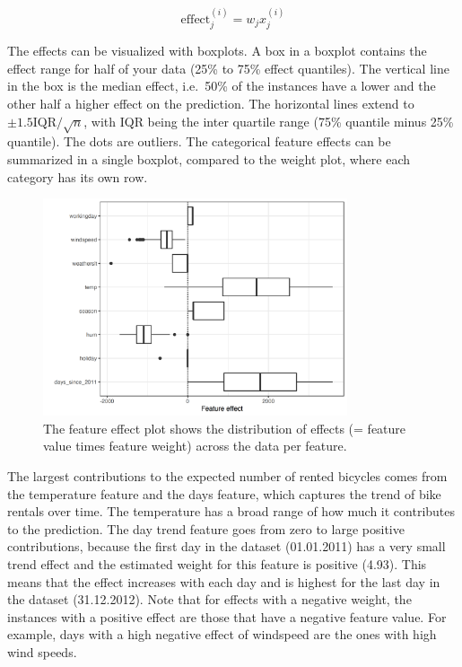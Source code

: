 \documentclass[
  11pt,
]{scrbook}
\begin{document}
\[\text{effect}_{j}^{(i)}=w_{j}x_{j}^{(i)}\]

The effects can be visualized with boxplots.
A box in a boxplot contains the effect range for half of your data (25\% to 75\% effect quantiles).
The vertical line in the box is the median effect, i.e.~50\% of the instances have a lower and the other half a higher effect on the prediction.
The horizontal lines extend to \(\pm1.5\text{IQR}/\sqrt{n}\), with IQR being the inter quartile range (75\% quantile minus 25\% quantile).
The dots are outliers.
The categorical feature effects can be summarized in a single boxplot, compared to the weight plot, where each category has its own row.

\begin{figure}

{\centering \includegraphics[width=0.8\textwidth]{images/linear-effects-1} 

}

\caption{The feature effect plot shows the distribution of effects (= feature value times feature weight) across the data per feature.}\label{fig:linear-effects}
\end{figure}

The largest contributions to the expected number of rented bicycles comes from the temperature feature and the days feature, which captures the trend of bike rentals over time.
The temperature has a broad range of how much it contributes to the prediction.
The day trend feature goes from zero to large positive contributions, because the first day in the dataset (01.01.2011) has a very small trend effect and the estimated weight for this feature is positive (4.93).
This means that the effect increases with each day and is highest for the last day in the dataset (31.12.2012).
Note that for effects with a negative weight, the instances with a positive effect are those that have a negative feature value.
For example, days with a high negative effect of windspeed are the ones with high wind speeds.
\end{document}
